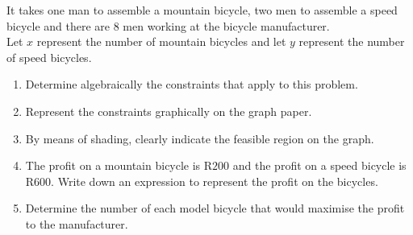 \begin{eocexercises}{}
\begin{enumerate}
{It takes one man to assemble a mountain bicycle, two men to assemble a speed bicycle and there are $8$ men working at the bicycle manufacturer.\\
Let $x$ represent the number of mountain bicycles and let $y$ represent the number of speed bicycles.
\begin{enumerate}
\item{Determine algebraically the constraints that apply to this problem.}
\item{Represent the constraints graphically on the graph paper.}
\item{By means of shading, clearly indicate the feasible region on the graph.}
\item{The profit on a mountain bicycle is R$200$ and the profit on a speed bicycle is R$600$. Write down an expression to represent the profit on the bicycles.}
\item{Determine the number of each model bicycle that would maximise the profit to the manufacturer.}
\end{enumerate}}
\end{enumerate}



\end{eocexercises} 




